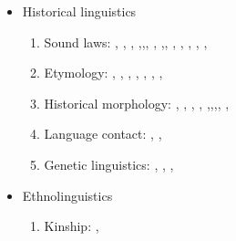 \documentclass[oldfontcommands,oneside,a4paper,11pt]{article}
\begin{document}
\begin{itemize}
\item Historical linguistics
\begin{enumerate}
\item Sound laws:  \citet{jacques00ywij}, \citet{jacques01dg}, \citet{jacques03dissimilation},   \citet{jacques04thimphu},\citet{jacques06comparaison},\citet{jacques09wazur}, \citet{jacques09e}, \citet{michaud10bonin},\citet{jacques10ndr}, \citet{jacques.michaud11naish},   \citet{rg-gj12yod}, \citet{jacques13arapaho}, \citet{jacques13yod}, \citet{jacques14snom},   \citet{jacques14esquisse}
\item  Etymology:    \citet{jacques07naksatram}, \citet{jacques08debther}, \citet{jacques09zz}, \citet{jacques10imperial}, \citet{jacques11ngwemi}, \citet{jacques12bear},  \citet{jacques13vama},   \citet{jacques14esquisse}
\item Historical morphology:  \citet{jacques03s.houzhui}, \citet{jacques06morpho}, \citet{jacques07chang},    \citet{jacques09tangutverb}, \citet{jacques10zos},\citet{jacques11tangut.verb},\citet{jacques12agreement},\citet{jacques12internal}, \citet{jacques14antipassive},   \citet{jacques14esquisse}
\item Language contact: \citet{antonov12kumush},   \citet{jacques12bear},
\item Genetic linguistics:  \citet{jacques07chang}, \citet{jacques12agreement}, \citet{jacques2012genetic},
\end{enumerate}
\item Ethnolinguistics
\begin{enumerate}
\item Kinship: \citet{jacques11kinship},  

\end{enumerate}
  
  
\end{itemize}




\end{document}
